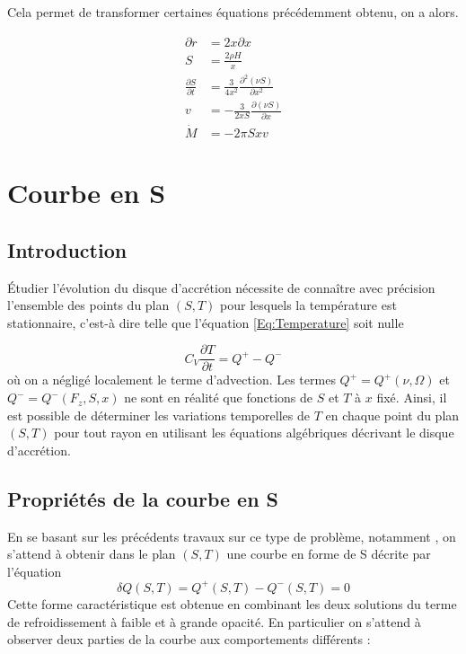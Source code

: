 \documentclass[a4paper,12pt]{article}
\begin{document}
Cela permet de transformer certaines équations précédemment obtenu, on a alors.

	\begin{align}
		\partial r &= 2x \partial x \\
		S &= \frac{2\rho H}{x} \\
		\frac{\partial S}{\partial t} &= \frac{3}{4 x^2} \frac{\partial^2 \left( \nu S \right)}{\partial x^2} \\
		v &= -\frac{3}{2 x S} \frac{\partial \left( \nu S \right)}{\partial x} \\
		\dot{M} &= -2\pi S x v
	\end{align}
      


\section{Courbe en S}
    \subsection{Introduction}

        Étudier l'évolution du disque d'accrétion nécessite de connaître avec précision l'ensemble des points du plan $(S,T)$ pour lesquels la température est stationnaire, c'est-à dire telle que l'équation \ref{Eq:Temperature} soit nulle
    
        \begin{equation}
            \label{Eq:EvoT}
            C_V \frac{\partial T}{\partial t} = Q^+ - Q^-
        \end{equation}
        où on a négligé localement le terme d'advection. Les termes $Q^+ = Q^+ (\nu , \Omega)$ et $Q^- = Q^- (F_z , S , x)$ ne sont en réalité que fonctions de $S$ et $T$ à $x$ fixé. Ainsi, il est possible de déterminer les variations temporelles de $T$ en chaque point du plan $(S,T)$ pour tout rayon en utilisant les équations algébriques décrivant le disque d'accrétion.
    
    \subsection{Propriétés de la courbe en S}
        En se basant sur les précédents travaux sur ce type de problème, notamment \cite{PapierAccretion}, on s'attend à obtenir dans le plan $(S,T)$ une courbe en forme de S décrite par l'équation
        \begin{equation}
            \label{Eq:DelQ}
            \delta Q (S, T) = Q^+ (S,T) - Q^- (S,T) = 0
        \end{equation}
        Cette forme caractéristique est obtenue en combinant les deux solutions du terme de refroidissement à faible et à grande opacité. En particulier on s'attend à observer deux parties de la courbe aux comportements différents : 
        
\end{document}
